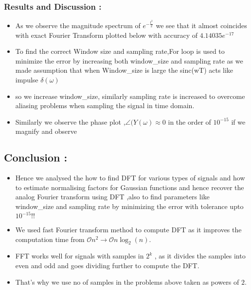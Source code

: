 \documentclass[11pt]{article}
\providecommand{\tightlist}{%
      \setlength{\itemsep}{0pt}\setlength{\parskip}{0pt}}
\begin{document}
    \begin{center}
    \end{center}
    { \hspace*{\fill} \\}
    
    \subsubsection{Results and Discussion :}\label{results-and-discussion}

\begin{itemize}
\tightlist
\item
  As we observe the magnitude spectrum of \(e^{-\frac{t^{2}}{ 2}}\) we
  see that it almost coincides with exact Fourier Transform plotted
  below with accuracy of \(4.14035e^{-17}\)
\item
  To find the correct Window size and sampling rate,For loop is used to
  minimize the error by increasing both window\_size and sampling rate
  as we made assumption that when Window\_size is large the sinc(wT)
  acts like impulse \(\delta(\omega)\)
\item
  so we increase window\_size, similarly sampling rate is increased to
  overcome aliasing problems when sampling the signal in time domain.
\item
  Similarly we observe the phase plot ,\(\angle(Y(\omega) \approx 0\) in
  the order of \(10^{-15}\) if we magnify and observe
\end{itemize}

    \subsection{Conclusion :}\label{conclusion}

\begin{itemize}
\tightlist
\item
  Hence we analysed the how to find DFT for various types of signals and
  how to estimate normalising factors for Gaussian functions and hence
  recover the analog Fourier transform using DFT ,also to find
  parameters like window\_size and sampling rate by minimizing the error
  with tolerance upto \(10^{-15}!!\)
\item
  We used fast Fourier transform method to compute DFT as it improves
  the computation time from
  \(\mathcal{O} n^2 \to \mathcal{O} n\log_2(n)\).
\item
  FFT works well for signals with samples in \(2^{k}\) , as it divides
  the samples into even and odd and goes dividing further to compute the
  DFT.
\item
  That's why we use no of samples in the problems above taken as powers
  of \(2\).
\end{itemize}


    
    
    
    
\end{document}
